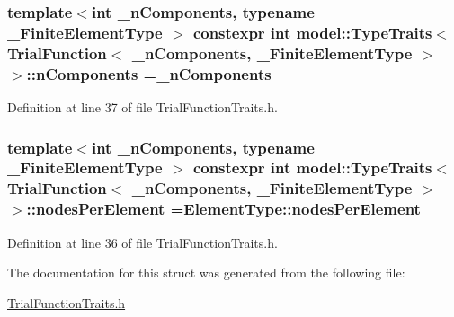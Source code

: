 \subsubsection[{n\+Components}]{\setlength{\rightskip}{0pt plus 5cm}template$<$int \+\_\+n\+Components, typename \+\_\+\+Finite\+Element\+Type $>$ constexpr int {\bf model\+::\+Type\+Traits}$<$ {\bf Trial\+Function}$<$ \+\_\+n\+Components, \+\_\+\+Finite\+Element\+Type $>$ $>$\+::n\+Components =\+\_\+n\+Components\hspace{0.3cm}{\ttfamily [static]}}\label{structmodel_1_1_type_traits_3_01_trial_function_3_01__n_components_00_01___finite_element_type_01_4_01_4_a799bac386a22215dacc0f0a61172f07a}


Definition at line 37 of file Trial\+Function\+Traits.\+h.

\hypertarget{structmodel_1_1_type_traits_3_01_trial_function_3_01__n_components_00_01___finite_element_type_01_4_01_4_af61c65452969d01864adf480f0b20b71}{}
\subsubsection[{nodes\+Per\+Element}]{\setlength{\rightskip}{0pt plus 5cm}template$<$int \+\_\+n\+Components, typename \+\_\+\+Finite\+Element\+Type $>$ constexpr int {\bf model\+::\+Type\+Traits}$<$ {\bf Trial\+Function}$<$ \+\_\+n\+Components, \+\_\+\+Finite\+Element\+Type $>$ $>$\+::nodes\+Per\+Element =Element\+Type\+::nodes\+Per\+Element\hspace{0.3cm}{\ttfamily [static]}}\label{structmodel_1_1_type_traits_3_01_trial_function_3_01__n_components_00_01___finite_element_type_01_4_01_4_af61c65452969d01864adf480f0b20b71}


Definition at line 36 of file Trial\+Function\+Traits.\+h.



The documentation for this struct was generated from the following file\+:\begin{DoxyCompactItemize}
\item 
\hyperlink{_trial_function_traits_8h}{Trial\+Function\+Traits.\+h}\end{DoxyCompactItemize}
